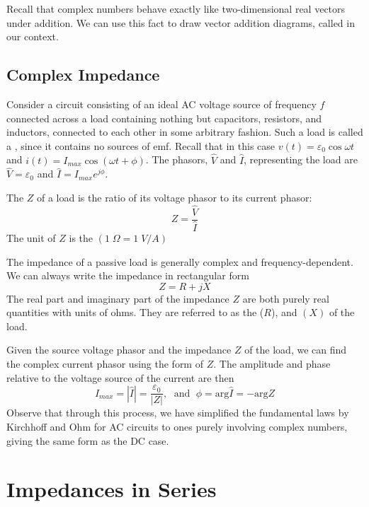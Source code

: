 \documentclass[12pt, a4paper, oneside, openright, titlepage]{book}
\begin{document}
Recall that complex numbers behave exactly like two-dimensional real vectors under addition. We can use this fact to draw vector addition diagrams, called  in our context.


\section{Complex Impedance}

Consider a circuit consisting of an ideal AC voltage source of frequency $f$ connected across a load containing nothing but capacitors, resistors, and inductors, connected to each other in some arbitrary fashion. Such a load is called a , since it contains no sources of emf. Recall that in this case $v(t) = \varepsilon_0 \cos\omega t$ and $i(t) = I_{max}\cos(\omega t+\phi)$. The phasors, $\hat{V}$ and $\hat{I}$, representing the load are $\hat{V} = \varepsilon_0$ and $\hat{I} = I_{max}e^{j\phi}$. 

\begin{defn}
    The  $Z$ of a load is the ratio of its voltage phasor to its current phasor: $$Z = \frac{\hat{V}}{\hat{I}}$$ The unit of $Z$ is the  $(1\;\Omega = 1\;V/A)$ 
\end{defn}
The impedance of a passive load is generally complex and frequency-dependent. We can always write the impedance in rectangular form $$Z = R + jX$$ The real part and imaginary part of the impedance $Z$ are both purely real quantities with units of ohms. They are referred to as the  ($R$), and  $(X)$ of the load. 

Given the source voltage phasor and the impedance $Z$ of the load, we can find the complex current phasor using the form of $Z$. The amplitude and phase relative to the voltage source of the current are then $$I_{max} = |\hat{I}| = \frac{\varepsilon_0}{|Z|},\;\text{ and }\;\phi = \text{arg}\hat{I} = -\text{arg}Z$$ Observe that through this process, we have simplified the fundamental laws by Kirchhoff and Ohm for AC circuits to ones purely involving complex numbers, giving the same form as the DC case.






\chapter{Impedances in Series}
\end{document}
